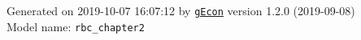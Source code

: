 \documentclass[10pt,a4paper]{article}
\numberwithin{equation}{section}
\begin{document}
\begin{flushleft}{\large
Generated  on 2019-10-07 16:07:12 by \href{http://gecon.r-forge.r-project.org/}{\texttt{gEcon}} version 1.2.0 (2019-09-08)\\
Model name: \verb+rbc_chapter2+
}\end{flushleft}



\end{document}
